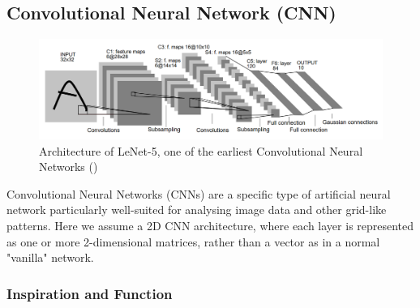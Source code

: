 \documentclass[12pt]{article}
\begin{document}
\subsection{
Convolutional Neural Network (CNN)
}

\begin{figure}[ht]
    \includegraphics[width=1\linewidth]{Le-Net 5.png}
    
    \caption{Architecture of LeNet-5, one of the earliest Convolutional Neural Networks (\cite{726791})} 
    \label{fig:lenet}
\end{figure}



Convolutional Neural Networks (CNNs) are a specific type of artificial neural network particularly well-suited for analysing image data and other grid-like patterns. 
Here we assume a 2D CNN architecture, where each layer is represented as one or more 2-dimensional matrices, rather than a vector as in a normal "vanilla" network.






\subsubsection*{Inspiration and Function}
\end{document}
